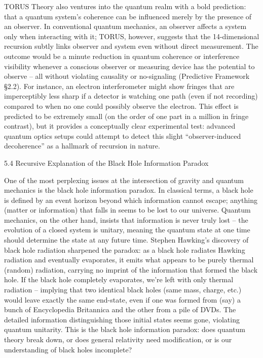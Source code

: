 \documentclass[]{article}
\begin{document}
TORUS Theory also ventures into the quantum realm with a bold
prediction: that a quantum system's coherence can be influenced merely
by the presence of an observer. In conventional quantum mechanics, an
observer affects a system only when interacting with it; TORUS, however,
suggests that the 14-dimensional recursion subtly links observer and
system even without direct measurement. The outcome would be a minute
reduction in quantum coherence or interference visibility whenever a
conscious observer or measuring device has the potential to observe --
all without violating causality or no-signaling (Predictive Framework
§2.2). For instance, an electron interferometer might show fringes that
are imperceptibly less sharp if a detector is watching one path (even if
not recording) compared to when no one could possibly observe the
electron. This effect is predicted to be extremely small (on the order
of one part in a million in fringe contrast), but it provides a
conceptually clear experimental test: advanced quantum optics setups
could attempt to detect this slight ``observer-induced decoherence'' as
a hallmark of recursion in nature.

5.4 Recursive Explanation of the Black Hole Information Paradox

One of the most perplexing issues at the intersection of gravity and
quantum mechanics is the black hole information paradox. In classical
terms, a black hole is defined by an event horizon beyond which
information cannot escape; anything (matter or information) that falls
in seems to be lost to our universe. Quantum mechanics, on the other
hand, insists that information is never truly lost -- the evolution of a
closed system is unitary, meaning the quantum state at one time should
determine the state at any future time. Stephen Hawking's discovery of
black hole radiation sharpened the paradox: as a black hole radiates
Hawking radiation and eventually evaporates, it emits what appears to be
purely thermal (random) radiation, carrying no imprint of the
information that formed the black hole. If the black hole completely
evaporates, we're left with only thermal radiation -- implying that two
identical black holes (same mass, charge, etc.) would leave exactly the
same end-state, even if one was formed from (say) a bunch of
Encyclopedia Britannica and the other from a pile of DVDs. The detailed
information distinguishing those initial states seems gone, violating
quantum unitarity. This is the black hole information paradox: does
quantum theory break down, or does general relativity need modification,
or is our understanding of black holes incomplete?
\end{document}
